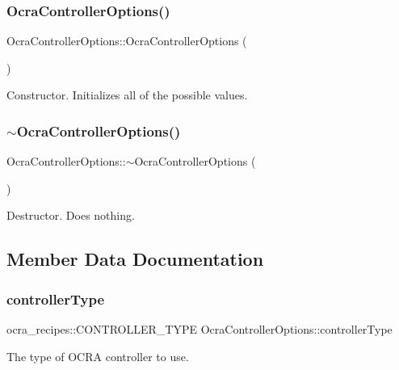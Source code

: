\subsubsection{\texorpdfstring{Ocra\+Controller\+Options()}{OcraControllerOptions()}}
{\footnotesize\ttfamily Ocra\+Controller\+Options\+::\+Ocra\+Controller\+Options (\begin{DoxyParamCaption}{ }\end{DoxyParamCaption})}

Constructor. Initializes all of the possible values. \hypertarget{classOcraControllerOptions_a22f514e92ccf91cc362c48a6c340ac19}{}\label{classOcraControllerOptions_a22f514e92ccf91cc362c48a6c340ac19} 
\subsubsection{\texorpdfstring{$\sim$\+Ocra\+Controller\+Options()}{~OcraControllerOptions()}}
{\footnotesize\ttfamily Ocra\+Controller\+Options\+::$\sim$\+Ocra\+Controller\+Options (\begin{DoxyParamCaption}{ }\end{DoxyParamCaption})}

Destructor. Does nothing. 

\subsection{Member Data Documentation}
\hypertarget{classOcraControllerOptions_aa533fe11c53b7fb17105f1edf48e1c0d}{}\label{classOcraControllerOptions_aa533fe11c53b7fb17105f1edf48e1c0d} 
\subsubsection{\texorpdfstring{controller\+Type}{controllerType}}
{\footnotesize\ttfamily ocra\+\_\+recipes\+::\+C\+O\+N\+T\+R\+O\+L\+L\+E\+R\+\_\+\+T\+Y\+PE Ocra\+Controller\+Options\+::controller\+Type}

The type of O\+C\+RA controller to use. \hypertarget{classOcraControllerOptions_a1edf322553d88c1ac2bf8947e9d942d7}{}\label{classOcraControllerOptions_a1edf322553d88c1ac2bf8947e9d942d7} 
